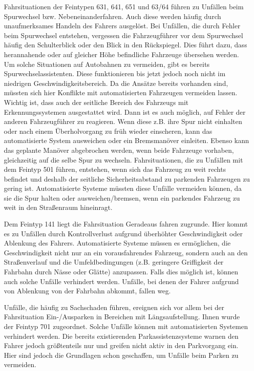 Fahrsituationen der Feintypen 631, 641, 651 und 63/64 führen zu Unfällen beim Spurwechsel bzw. Nebeneinanderfahren. Auch diese werden häufig durch unaufmerksames Handeln des Fahrers ausgelöst. Bei Unfällen, die durch Fehler beim Spurwechsel entstehen, vergessen die Fahrzeugführer vor dem Spurwechsel häufig den Schulterblick oder den Blick in den Rückspiegel. Dies führt dazu, dass herannahende oder auf gleicher Höhe befindliche Fahrzeuge übersehen werden. Um solche Situationen auf Autobahnen zu vermeiden, gibt es bereits Spurwechselassistenten. Diese funktionieren bis jetzt jedoch noch nicht im niedrigen Geschwindigkeitsbereich. Da die Ansätze bereits vorhanden sind, müssten sich hier Konflikte mit automatisierten Fahrzeugen vermeiden lassen. Wichtig ist, dass auch der seitliche Bereich des Fahrzeugs mit Erkennungssystemen ausgestattet wird. Dann ist es auch möglich, auf Fehler der anderen Fahrzeugführer zu reagieren. Wenn diese z.B. ihre Spur nicht einhalten oder nach einem Überholvorgang zu früh wieder einscheren, kann das automatisierte System ausweichen oder ein Bremsmanöver einleiten. Ebenso kann das geplante Manöver abgebrochen werden, wenn beide Fahrzeuge vorhaben, gleichzeitig auf die selbe Spur zu wechseln. Fahrsituationen, die zu Unfällen mit dem Feintyp 501 führen, entstehen, wenn sich das Fahrzeug zu weit rechts befindet und deshalb der seitliche Sicherheitsabstand zu parkenden Fahrzeugen zu gering ist. Automatisierte Systeme müssten diese Unfälle vermeiden können, da sie die Spur halten oder ausweichen/bremsen, wenn ein parkendes Fahrzeug zu weit in den Straßenraum hineinragt.

Dem Feintyp 141 liegt die Fahrsituation Geradeaus fahren zugrunde. Hier kommt es zu Unfällen durch Kontrollverlust aufgrund überhöhter Geschwindigkeit oder Ablenkung des Fahrers. Automatisierte Systeme müssen es ermöglichen, die Geschwindigkeit nicht nur an ein vorausfahrendes Fahrzeug, sondern auch an den Straßenverlauf und die Umfeldbedingungen (z.B. geringere Griffigkeit der Fahrbahn durch Nässe oder Glätte) anzupassen. Falls dies möglich ist, können auch solche Unfälle verhindert werden. Unfälle, bei denen der Fahrer aufgrund von Ablenkung von der Fahrbahn abkommt, fallen weg.

Unfälle, die häufig zu Sachschaden führen, ereignen sich vor allem bei der Fahrsituation Ein-/Ausparken in Bereichen mit Längsaufstellung. Ihnen wurde der Feintyp 701 zugeordnet. Solche Unfälle können mit automatisierten Systemen verhindert werden. Die bereits existierenden Parkassistenzsysteme warnen den Fahrer jedoch größtenteils nur und greifen nicht aktiv in den Parkvorgang ein. Hier sind jedoch die Grundlagen schon geschaffen, um Unfälle beim Parken zu vermeiden.

